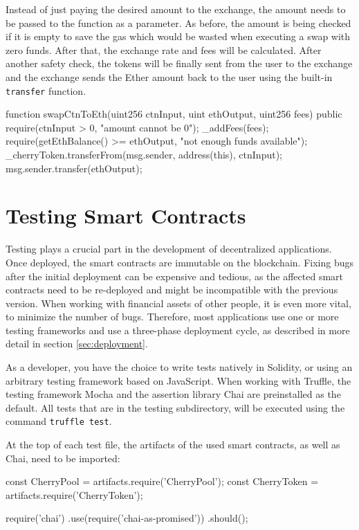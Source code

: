 Instead of just paying the desired amount to the exchange, the amount needs to be passed to the function as a parameter. As before, the amount is being checked
if it is empty to save the gas which would be wasted when executing a swap with zero funds. After that, the exchange rate and fees will be calculated. After
another safety check, the tokens will be finally sent from the user to the exchange and the exchange sends the Ether amount back to the user using the
built-in \texttt{transfer} function.

\begin{GenericCode}
  function swapCtnToEth(uint256 ctnInput, uint ethOutput, uint256 fees) public {
    require(ctnInput > 0, "amount cannot be 0");
    _addFees(fees);
    require(getEthBalance() >= ethOutput, "not enough funds available");
    _cherryToken.transferFrom(msg.sender, address(this), ctnInput);
    msg.sender.transfer(ethOutput);
  }
\end{GenericCode}

\section{Testing Smart Contracts}
Testing plays a crucial part in the development of decentralized applications. Once deployed, the smart contracts are immutable on the blockchain. Fixing bugs after the initial deployment can be expensive and tedious, as the affected smart contracts need to be re-deployed and might be incompatible with the previous version. When working with financial assets of other people, it is even more vital, to minimize the number of bugs. Therefore, most applications use one or more testing frameworks and use a three-phase deployment cycle, as described in more detail in section \ref{sec:deployment}.

As a developer, you have the choice to write tests natively in Solidity, or using an arbitrary testing framework based on JavaScript. When working with Truffle, the testing framework Mocha\cite{Mocha} and the assertion library Chai\cite{Chai} are preinstalled as the default. All tests that are in the testing subdirectory, will be executed using the command \texttt{truffle test}.

At the top of each test file, the artifacts of the used smart contracts, as well as Chai, need to be imported:
\begin{JsCode}
const CherryPool = artifacts.require('CherryPool');
const CherryToken = artifacts.require('CherryToken');

require('chai')
  .use(require('chai-as-promised'))
  .should();	
\end{JsCode}

